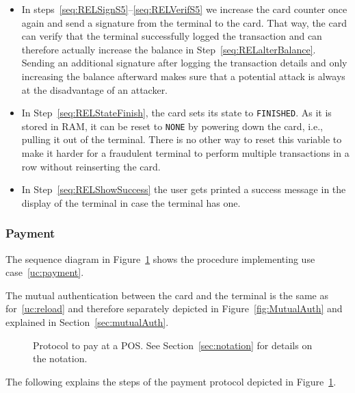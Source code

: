 \documentclass{article}
\begin{document}
\begin{itemize}
    \item In steps~\ref{seq:RELSignS5}--\ref{seq:RELVerifS5} we increase the card counter once again and send a signature from the terminal to the card.
          That way, the card can verify that the terminal successfully logged the transaction and can therefore actually increase the balance in Step~\ref{seq:RELalterBalance}.
          Sending an additional signature after logging the transaction details and only increasing the balance afterward makes sure that a potential attack is always at the disadvantage of an attacker.

    \item In Step~\ref{seq:RELStateFinish}, the card sets its state to \texttt{FINISHED}.
    As it is stored in RAM, it can be reset to \texttt{NONE} by powering down the card, i.e., pulling it out of the terminal.
    There is no other way to reset this variable to make it harder for a fraudulent terminal to perform multiple transactions in a row without reinserting the card.

    \item In Step~\ref{seq:RELShowSuccess} the user gets printed a success message in the display of the terminal in case the terminal has one.
\end{itemize}

\subsubsection{Payment}
The sequence diagram in Figure~\ref{fig:POSProtocol} shows the procedure implementing use case~\ref{uc:payment}.

The mutual authentication between the card and the terminal is the same as for~\ref{uc:reload} and therefore separately depicted in Figure~\ref{fig:MutualAuth} and explained in Section~\ref{sec:mutualAuth}.

\begin{figure}
    \centering
    
    \caption{Protocol to pay at a POS.
    See Section~\ref{sec:notation} for details on the notation.
    }
    \label{fig:POSProtocol}
\end{figure}

The following explains the steps of the payment protocol depicted in Figure~\ref{fig:POSProtocol}.
\end{document}
